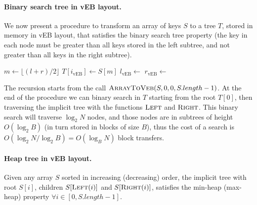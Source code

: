 \paragraph{Binary search tree in vEB layout.} We now present a procedure to transform an array of keys $S$ to a tree $T$, stored in memory in vEB layout, that satisfies the binary search tree property (the key in each node must be greater than all keys stored in the left subtree, and not greater than all keys in the right subtree).
\begin{algorithmic}[1]
		   \State \Return{}
		 \EndIf
	 \State $m \gets \lfloor (l+r)/2 \rfloor$
	 \State $T[i_{\text{vEB}}] \gets S[m]$ 
	 \State $l_{\text{vEB}} \gets $ 
	 \State $r_{\text{vEB}} \gets $ 
	 \State {}
	 \State {}
	\EndFunction
\end{algorithmic}
The recursion starts from the call $\textsc{ArrayToVeb}(S, 0, 0, S.length-1)$. At the end of the procedure we can binary search in $T$ starting from the root $T[0]$, then traversing the implicit tree with the functions $\textsc{Left}$ and $\textsc{Right}$. This binary search will traverse $\log_2 N$ nodes, and those nodes are in subtrees of height $O(\log_2 B)$ (in turn stored in blocks of size $B$), thus the cost of a search is $O(\log_2 N / \log_2 B)=O(\log_B N)$ block transfers.

\paragraph{Heap tree in vEB layout.}  Given any array $S$ sorted in increasing (decreasing) order, the implicit tree with root $S[i]$, children $S[\textsc{Left}(i)]$ and $S[\textsc{Right}(i)]$, satisfies the min-heap (max-heap) property $\forall i \in [0, S.length-1]$.